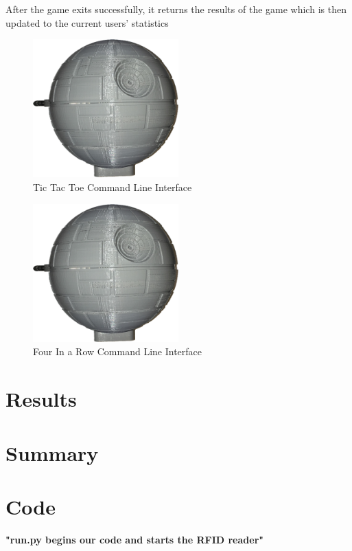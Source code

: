 \documentclass[notitlepage,11pt]{article}
\begin{document}
        After the game exits successfully, it returns the results of the game 
        which is then updated to the current users' statistics

        \begin{figure}[h]
            \centering
            \includegraphics[width=0.5\textwidth]{images/deathstar.png}
            \caption{Tic Tac Toe Command Line Interface}
            \label{fig:ticCommand}
        \end{figure}

        \begin{figure}[h]
            \centering
            \includegraphics[width=0.5\textwidth]{images/deathstar.png}
            \caption{ Four In a Row Command Line Interface}
            \label{fig:fourCommand}
        \end{figure}

    \section{Results}

    \section{Summary}

    \section{Code}
        \textbf{"run.py begins our code and starts the RFID reader"}
        
\end{document}
